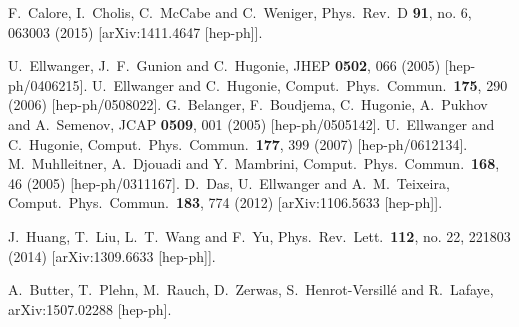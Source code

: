 \documentclass[preprintnumbers,superscriptaddress,nofootinbib,aps,prd,floatfix]{revtex4}
\begin{document}
\begin{thebibliography}{99}
  F.~Calore, I.~Cholis, C.~McCabe and C.~Weniger,
  Phys.\ Rev.\ D {\bf 91}, no. 6, 063003 (2015)
  [arXiv:1411.4647 [hep-ph]].
 
  U.~Ellwanger, J.~F.~Gunion and C.~Hugonie,
  JHEP {\bf 0502}, 066 (2005)
  [hep-ph/0406215].
  U.~Ellwanger and C.~Hugonie,
  Comput.\ Phys.\ Commun.\  {\bf 175}, 290 (2006)
  [hep-ph/0508022].
  G.~Belanger, F.~Boudjema, C.~Hugonie, A.~Pukhov and A.~Semenov,
  JCAP {\bf 0509}, 001 (2005)
  [hep-ph/0505142].
  U.~Ellwanger and C.~Hugonie,
  Comput.\ Phys.\ Commun.\  {\bf 177}, 399 (2007)
  [hep-ph/0612134].
  M.~Muhlleitner, A.~Djouadi and Y.~Mambrini,
  Comput.\ Phys.\ Commun.\  {\bf 168}, 46 (2005)
  [hep-ph/0311167].
  D.~Das, U.~Ellwanger and A.~M.~Teixeira,
  Comput.\ Phys.\ Commun.\  {\bf 183}, 774 (2012)
  [arXiv:1106.5633 [hep-ph]].

  J.~Huang, T.~Liu, L.~T.~Wang and F.~Yu,
  Phys.\ Rev.\ Lett.\  {\bf 112}, no. 22, 221803 (2014)
  [arXiv:1309.6633 [hep-ph]].

  A.~Butter, T.~Plehn, M.~Rauch, D.~Zerwas, S.~Henrot-Versillé and R.~Lafaye,
  arXiv:1507.02288 [hep-ph].
   
\end{thebibliography}
\end{document}
